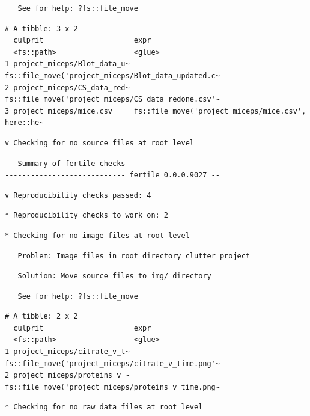 \documentclass[12pt,twoside]{reedthesis}
\begin{document}
\begin{verbatim}
   See for help: ?fs::file_move
\end{verbatim}
\begin{verbatim}
# A tibble: 3 x 2
  culprit                     expr                                              
  <fs::path>                  <glue>                                            
1 project_miceps/Blot_data_u~ fs::file_move('project_miceps/Blot_data_updated.c~
2 project_miceps/CS_data_red~ fs::file_move('project_miceps/CS_data_redone.csv'~
3 project_miceps/mice.csv     fs::file_move('project_miceps/mice.csv', here::he~
\end{verbatim}
\begin{verbatim}
v Checking for no source files at root level
\end{verbatim}
\begin{verbatim}
-- Summary of fertile checks --------------------------------------------------------------------- fertile 0.0.0.9027 --
\end{verbatim}
\begin{verbatim}
v Reproducibility checks passed: 4
\end{verbatim}
\begin{verbatim}
* Reproducibility checks to work on: 2
\end{verbatim}
\begin{verbatim}
* Checking for no image files at root level
\end{verbatim}
\begin{verbatim}
   Problem: Image files in root directory clutter project
\end{verbatim}
\begin{verbatim}
   Solution: Move source files to img/ directory
\end{verbatim}
\begin{verbatim}
   See for help: ?fs::file_move
\end{verbatim}
\begin{verbatim}
# A tibble: 2 x 2
  culprit                     expr                                              
  <fs::path>                  <glue>                                            
1 project_miceps/citrate_v_t~ fs::file_move('project_miceps/citrate_v_time.png'~
2 project_miceps/proteins_v_~ fs::file_move('project_miceps/proteins_v_time.png~
\end{verbatim}
\begin{verbatim}
* Checking for no raw data files at root level
\end{verbatim}
\end{document}

